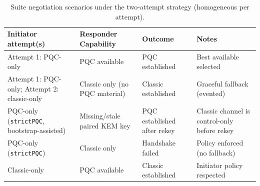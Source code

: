 \begin{table}[!t]
\centering
\caption{Suite negotiation scenarios under the two-attempt strategy (homogeneous per attempt).}
\label{tab:suite-negotiation-scenarios}
\begin{tabular}{@{}
  >{\raggedright\arraybackslash}p{}
  >{\raggedright\arraybackslash}p{}
  >{\raggedright\arraybackslash}p{}
  >{\raggedright\arraybackslash}p{}@{}}
\toprule\noalign{}
\begin{minipage}[b]{\linewidth}\raggedright
Initiator attempt(s)
\end{minipage} & \begin{minipage}[b]{\linewidth}\raggedright
Responder Capability
\end{minipage} & \begin{minipage}[b]{\linewidth}\raggedright
Outcome
\end{minipage} & \begin{minipage}[b]{\linewidth}\raggedright
Notes
\end{minipage} \\
\midrule
Attempt 1: PQC-only & PQC available & PQC established & Best available selected \\
Attempt 1: PQC-only; Attempt 2: classic-only & Classic only (no PQC material) & Classic established & Graceful fallback (evented) \\
PQC-only (\texttt{strictPQC}, bootstrap-assisted) & Missing/stale paired KEM key & PQC established after rekey & Classic channel is control-only before rekey \\
PQC-only (\texttt{strictPQC}) & Classic only & Handshake failed & Policy enforced (no fallback) \\
Classic-only & PQC available & Classic established & Initiator policy respected \\
\bottomrule
\end{tabular}
\end{table}

